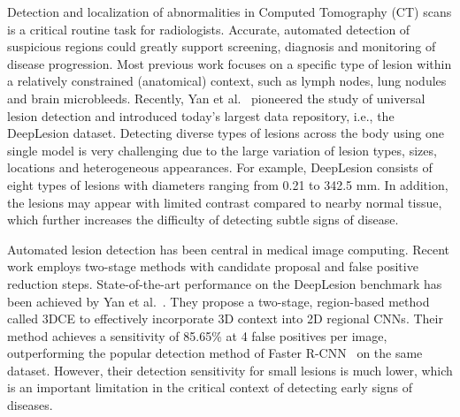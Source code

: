 \documentclass[runningheads,a4paper]{llncs}
\begin{document}
Detection and localization of abnormalities in Computed Tomography (CT) scans is a critical routine task for radiologists. Accurate, automated detection of suspicious regions could greatly support screening, diagnosis and monitoring of disease progression. Most previous work focuses on a specific type of lesion within a relatively constrained (anatomical) context, such as lymph nodes, lung nodules and brain microbleeds. Recently, Yan et al.~\cite{yan2018deep} pioneered the study of universal lesion detection and introduced today's largest data repository, i.e., the DeepLesion dataset.
Detecting diverse types of lesions across the body using one single model is very challenging due to the large variation of lesion types, sizes, locations and heterogeneous appearances. For example, DeepLesion consists of eight types of lesions with diameters ranging from 0.21 to 342.5 mm. In addition, the lesions may appear with limited contrast compared to nearby normal tissue, which further increases the difficulty of detecting subtle signs of disease.

Automated lesion detection has been central in medical image computing. Recent work employs two-stage methods with candidate proposal and false positive reduction steps. 
State-of-the-art performance on the DeepLesion benchmark has been achieved by Yan et al.~\cite{yan20183dce}.
They propose a two-stage, region-based method called 3DCE to effectively incorporate 3D context into 2D regional CNNs. Their method achieves a sensitivity of 85.65\% at 4 false positives per image, outperforming the popular detection method of Faster R-CNN~\cite{ren2015faster} on the same dataset.
However, their detection sensitivity for small lesions is much lower, which is an important limitation in the critical context of detecting early signs of diseases.


\begin{comment}
Meanwhile, most existing works only focused on specific type of lesion at relatively constrained variations, such as detecting lymph nodes~\cite{roth2014new} and lung nodules~\cite{setio2017validation} from CT images.
In terms of the universal lesion detection, Yan et al.~\cite{yan2018deep} pioneered this research direction by releasing the large-scale DeepLesion dataset. Later on, they followed-up by proposing a region-based (two-stage) framework of 3D context enhanced CNN, achieving a sensitivity of 84.37\% at 4 false positives per image. 
We find that their detection accuracy on small lesions was not very high, due to that their designed model did not particularly address the severe size variations of the lesions.
\end{comment}
\end{document}
